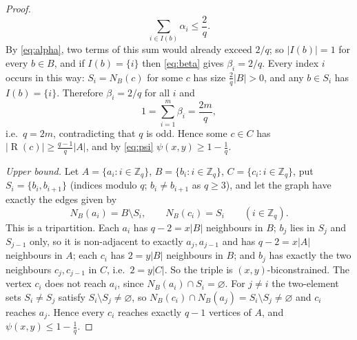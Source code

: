 \documentclass[11pt,a4paper]{article}
\theoremstyle{plain}
\theoremstyle{definition}
\theoremstyle{remark}
\newcommand{\NB}{N_B}
\newcommand{\Z}{\mathbb Z}
\DeclareMathOperator{\reach}{R}
\begin{document}
\begin{proof}
\begin{equation}\label{eq:alphasum}
 \sum_{i\in I(b)}\alpha_i\le\frac2q .
\end{equation}
By \eqref{eq:alpha}, two terms of this sum would already exceed $2/q$; so $|I(b)|=1$ for every $b\in B$, and if $I(b)=\{i\}$ then \eqref{eq:beta} gives $\beta_i=2/q$. Every index $i$ occurs in this way: $S_i=\NB(c)$ for some $c$ has size $\frac2q|B|>0$, and any $b\in S_i$ has $I(b)=\{i\}$. Therefore $\beta_i=2/q$ for all $i$ and
\[
 1=\sum_{i=1}^m\beta_i=\frac{2m}q,
\]
i.e.\ $q=2m$, contradicting that $q$ is odd. Hence some $c\in C$ has $|\reach(c)|\ge\frac{q-1}q|A|$, and by \eqref{eq:psi} $\psi(x,y)\ge1-\frac1q$.

\emph{Upper bound.} Let $A=\{a_i:i\in\Z_q\}$, $B=\{b_i:i\in\Z_q\}$, $C=\{c_i:i\in\Z_q\}$, put $S_i=\{b_i,b_{i+1}\}$ (indices modulo $q$; $b_i\ne b_{i+1}$ as $q\ge3$), and let the graph have exactly the edges given by
\[
 \NB(a_i)=B\setminus S_i,\qquad \NB(c_i)=S_i\qquad(i\in\Z_q).
\]
This is a tripartition. Each $a_i$ has $q-2=x|B|$ neighbours in $B$; $b_j$ lies in $S_j$ and $S_{j-1}$ only, so it is non-adjacent to exactly $a_j,a_{j-1}$ and has $q-2=x|A|$ neighbours in $A$; each $c_i$ has $2=y|B|$ neighbours in $B$; and $b_j$ has exactly the two neighbours $c_j,c_{j-1}$ in $C$, i.e.\ $2=y|C|$. So the triple is $(x,y)$-biconstrained. The vertex $c_i$ does not reach $a_i$, since $\NB(a_i)\cap S_i=\varnothing$. For $j\ne i$ the two-element sets $S_i\ne S_j$ satisfy $S_i\setminus S_j\ne\varnothing$, so $\NB(c_i)\cap\NB(a_j)=S_i\setminus S_j\ne\varnothing$ and $c_i$ reaches $a_j$. Hence every $c_i$ reaches exactly $q-1$ vertices of $A$, and $\psi(x,y)\le1-\frac1q$.
\end{proof}
\end{document}
